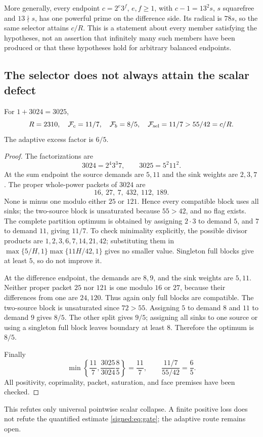 More generally, every endpoint \(c=2^e3^f\), \(e,f\ge1\), with \(c-1=13^2s\), \(s\) squarefree and \(13\nmid s\), has one powerful prime on the difference side. Its radical is \(78s\), so the same selector attains \(c/R\). This is a statement about every member satisfying the hypotheses, not an assertion that infinitely many such members have been produced or that these hypotheses hold for arbitrary balanced endpoints.

\subsection{The selector does not always attain the scalar defect}
\begin{proposition}\label{signed:prop:counter}
For \(1+3024=3025\),
\[
 R=2310,\quad \mathcal F_c=11/7,\quad\mathcal F_b=8/5,\quad
 \mathcal F_{\mathrm{sel}}=11/7>55/42=c/R.
\]
The adaptive excess factor is \(6/5\).
\end{proposition}
\begin{proof}
The factorizations are
\[
 3024=2^4 3^3 7,\qquad3025=5^2 11^2.
\]
At the sum endpoint the source demands are \(5,11\) and the sink weights are \(2,3,7\). The proper whole-power packets of \(3024\) are
\[
 16,\ 27,\ 7,\ 432,\ 112,\ 189.
\]
None is minus one modulo either \(25\) or \(121\). Hence every compatible block uses all sinks; the two-source block is unsaturated because \(55>42\), and no flag exists. The complete partition optimum is obtained by assigning \(2\cdot3\) to demand \(5\), and \(7\) to demand \(11\), giving \(11/7\). To check minimality explicitly, the possible divisor products are \(1,2,3,6,7,14,21,42\); substituting them in \(\max\{5/H,1\}\max\{11H/42,1\}\) gives no smaller value. Singleton full blocks give at least \(5\), so do not improve it.

At the difference endpoint, the demands are \(8,9\), and the sink weights are \(5,11\). Neither proper packet \(25\) nor \(121\) is one modulo \(16\) or \(27\), because their differences from one are \(24,120\). Thus again only full blocks are compatible. The two-source block is unsaturated since \(72>55\). Assigning \(5\) to demand \(8\) and \(11\) to demand \(9\) gives \(8/5\). The other split gives \(9/5\); assigning all sinks to one source or using a singleton full block leaves boundary at least \(8\). Therefore the optimum is \(8/5\).

Finally
\[
 \min\left\{\frac{11}7,\frac{3025}{3024}\frac85\right\}
 =\frac{11}7,
 \qquad\frac{11/7}{55/42}=\frac65.
\]
All positivity, coprimality, packet, saturation, and face premises have been checked.
\end{proof}
This refutes only universal pointwise scalar collapse. A finite positive loss does not refute the quantified estimate \eqref{signed:eq:gate}; the adaptive route remains open.

